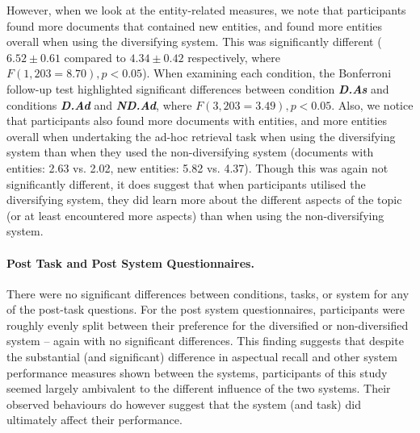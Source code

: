 However, when we look at the entity-related measures, we note that participants found more documents that contained new entities, and found more entities overall when using the diversifying system. This was significantly different ($6.52\pm0.61$ compared to $4.34\pm0.42$ respectively, where $F(1, 203=8.70), p<0.05$). When examining each condition, the Bonferroni follow-up test highlighted significant differences between condition \textbf{\emph{D.As}} and conditions \textbf{\emph{D.Ad}} and \textbf{\emph{ND.Ad}}, where $F(3, 203=3.49), p<0.05$. Also, we notice that participants also found more documents with entities, and more entities overall when undertaking the ad-hoc retrieval task when using the diversifying system than when they used the non-diversifying system (documents with entities: 2.63 vs. 2.02, new entities: 5.82 vs. 4.37). Though this was again not significantly different, it does suggest that when participants utilised the diversifying system, they did learn more about the different aspects of the topic (or at least encountered more aspects) than when using the non-diversifying system. 

\paragraph{Post Task and Post System Questionnaires.} There were no significant differences between conditions, tasks, or system for any of the post-task questions. For the post system questionnaires, participants were roughly evenly split between their preference for the diversified or non-diversified system -- again with no significant differences. This finding suggests that despite the substantial (and significant) difference in aspectual recall and other system performance measures shown between the systems, participants of this study seemed largely ambivalent to the different influence of the two systems. Their observed behaviours do however suggest that the system (and task) did ultimately affect their performance.

